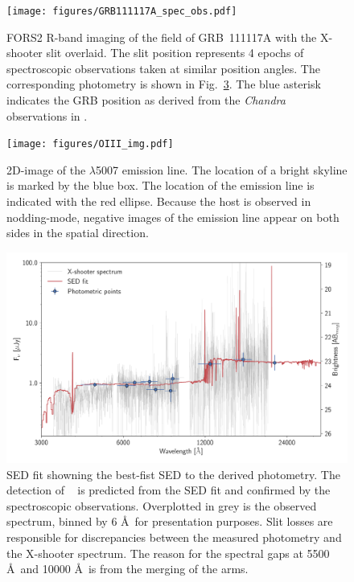 \documentclass{aa}    %
\begin{document}
\begin{figure}
	\centering
	\texttt{[image: figures/GRB111117A\_spec\_obs.pdf]}
	\caption{
	FORS2 R-band imaging of the field of GRB~111117A with the X-shooter slit overlaid. The slit
	position represents 4 epochs of spectroscopic observations taken at similar
	position angles. The corresponding photometry
	is shown in Fig.~\ref{fig:SED}. The blue asterisk indicates the GRB position as
	derived from the \emph{Chandra} observations in \citet{Sakamoto2013}. 
	}
	\label{fig:spec_setup}
\end{figure}

\begin{figure}
	\centering
	\texttt{[image: figures/OIII\_img.pdf]}
	\caption{2D-image of the \oiii$\lambda$5007 emission line. The location of a bright skyline is marked by the blue box. The location of the emission line is indicated with the red ellipse. Because the host is observed in nodding-mode, negative images of the emission line appear on both sides in the spatial direction.}
	\label{fig:line}
\end{figure}


\begin{figure}
	\centering
	\includegraphics[width=16cm]{figures/SEDspecphot.pdf}
	\caption{SED fit showning the best-fist SED to the derived photometry. The detection of \lya~ is predicted from the SED fit and confirmed by the spectroscopic observations. Overplotted in grey is the observed spectrum, binned by 6 \AA~for presentation purposes. Slit losses are responsible for discrepancies between the measured photometry and the X-shooter spectrum. The reason for the spectral gaps at 5500 \AA~and 10000 \AA~is from the merging of the arms.}
	\label{fig:SED}
\end{figure}
\end{document}
